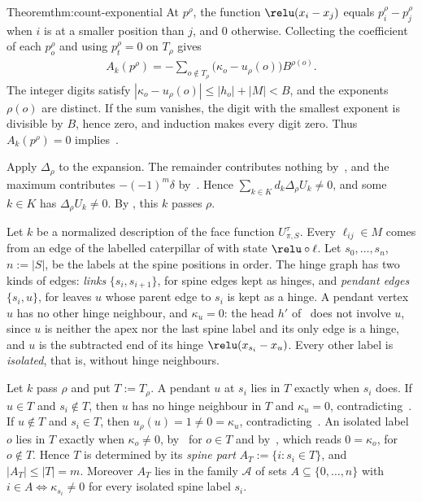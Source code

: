 \begin{Proof}{Theorem}{thm:count-exponential}
At $p^\rho$, the function $\relu(x_i-x_j)$ equals $p^\rho_i-p^\rho_j$ when
$i$ is at a smaller position than $j$, and $0$ otherwise. Collecting the
coefficient of each $p^\rho_o$ and using $p^\rho_t=0$ on $T_\rho$ gives
\begin{align}\label{eq:preactivation-digits}
 A_k(p^\rho)=-\sum_{o\notin T_\rho}\bigl(\kappa_o-u_\rho(o)\bigr)B^{\rho(o)}.
\end{align}
The integer digits satisfy
$|\kappa_o-u_\rho(o)|\leq|h_o|+|M|<B$, and the exponents $\rho(o)$ are
distinct. If the sum vanishes, the digit with the smallest exponent is
divisible by $B$, hence zero, and induction makes every digit zero. Thus
$A_k(p^\rho)=0$ implies~.

Apply $\Delta_\rho$ to the expansion. The remainder contributes nothing
by~, and the maximum contributes $-(-1)^m\delta$
by~. Hence
$\sum_{k\in K}d_k\Delta_\rho U_k\neq0$, and some $k\in K$ has
$\Delta_\rho U_k\neq0$. By , this
$k$ passes $\rho$.

Let $k$ be a normalized description of the face function $U^\tau_{\pi,S}$.
Every $\ell_{ij}\in M$ comes from an edge of the labelled caterpillar of
 with state $\relu\circ\ell$. Let
$s_0,\ldots,s_n$, $n:=|S|$, be the labels at the spine positions in order.
The hinge graph has two kinds of edges: \emph{links}
$\{s_i,s_{i+1}\}$, for spine edges kept as hinges, and \emph{pendant edges}
$\{s_i,u\}$, for leaves $u$ whose parent edge to $s_i$ is kept as a hinge.
A pendant vertex $u$ has no other hinge neighbour, and $\kappa_u=0$: the
head $h'$ of~ does not involve $u$, since $u$ is
neither the apex nor the last spine label and its only edge is a hinge, and
$u$ is the subtracted end of its hinge $\relu(x_{s_i}-x_u)$. Every other
label is \emph{isolated}, that is, without hinge neighbours.

Let $k$ pass $\rho$ and put $T:=T_\rho$. A pendant $u$ at $s_i$ lies in $T$
exactly when $s_i$ does. If $u\in T$ and $s_i\notin T$, then $u$ has no
hinge neighbour in $T$ and $\kappa_u=0$, contradicting~.
If $u\notin T$ and $s_i\in T$, then $u_\rho(u)=1\neq0=\kappa_u$,
contradicting~. An isolated label $o$ lies in $T$ exactly
when $\kappa_o\neq0$, by~ for $o\in T$ and
by~, which reads $0=\kappa_o$, for $o\notin T$. Hence $T$
is determined by its \emph{spine part} $A_T:=\{i:s_i\in T\}$, and
$|A_T|\leq|T|=m$. Moreover $A_T$ lies in the family $\mathcal A$ of sets
$A\subseteq\{0,\ldots,n\}$ with $i\in A\Leftrightarrow\kappa_{s_i}\neq0$ for
every isolated spine label $s_i$.


\end{Proof}
